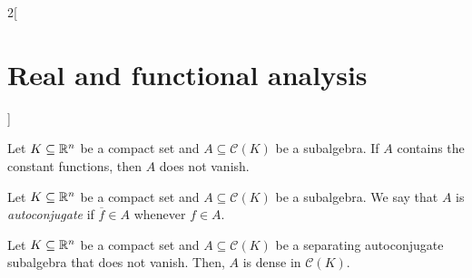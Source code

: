 \documentclass[../../../main_math.tex]{subfiles}
\begin{document}
\begin{multicols}{2}[\section{Real and functional analysis}]
  \begin{lemma}
    Let $K\subseteq \mathbb{R}^n$ be a compact set and $A\subseteq \mathcal{C}(K)$ be a subalgebra. If $A$ contains the constant functions, then $A$ does not vanish.
  \end{lemma}
  \begin{definition}
    Let $K\subseteq \mathbb{R}^n$ be a compact set and $A\subseteq \mathcal{C}(K)$ be a subalgebra. We say that $A$ is \emph{autoconjugate} if $\overline{f}\in A$ whenever $f\in A$.
  \end{definition}
  \begin{theorem}
    Let $K\subseteq \mathbb{R}^n$ be a compact set and $A\subseteq \mathcal{C}(K)$ be a separating autoconjugate subalgebra that does not vanish. Then, $A$ is dense in $\mathcal{C}(K)$.
  \end{theorem}
\end{multicols}
\end{document}
